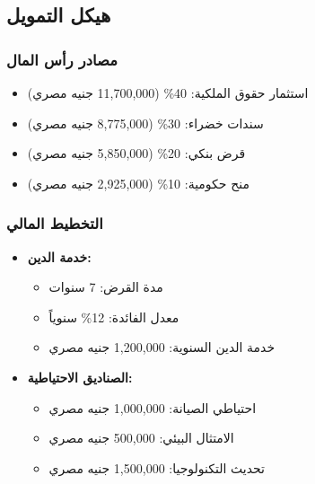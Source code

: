 \subsection{هيكل التمويل}

\subsubsection{مصادر رأس المال}
\begin{itemize}
    \item استثمار حقوق الملكية: 40\% (11,700,000 جنيه مصري)
    \item سندات خضراء: 30\% (8,775,000 جنيه مصري)
    \item قرض بنكي: 20\% (5,850,000 جنيه مصري)
    \item منح حكومية: 10\% (2,925,000 جنيه مصري)
\end{itemize}

\subsubsection{التخطيط المالي}
\begin{itemize}
    \item \textbf{خدمة الدين:}
    \begin{itemize}
        \item مدة القرض: 7 سنوات
        \item معدل الفائدة: 12\% سنوياً
        \item خدمة الدين السنوية: 1,200,000 جنيه مصري
    \end{itemize}
    
    \item \textbf{الصناديق الاحتياطية:}
    \begin{itemize}
        \item احتياطي الصيانة: 1,000,000 جنيه مصري
        \item الامتثال البيئي: 500,000 جنيه مصري
        \item تحديث التكنولوجيا: 1,500,000 جنيه مصري
    \end{itemize}
\end{itemize}

